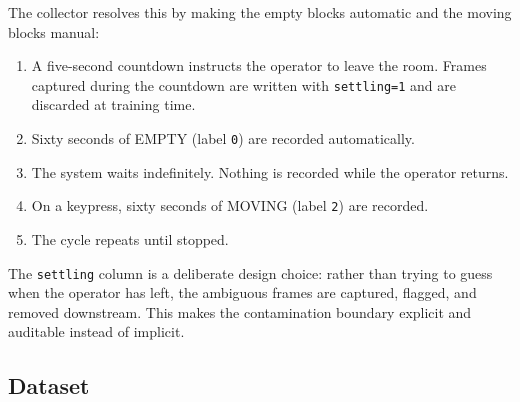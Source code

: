 \documentclass[11pt,a4paper]{article}
\newcommand{\code}[1]{\texttt{\small #1}}
\begin{document}
The collector resolves this by making the empty blocks automatic and the moving
blocks manual:

\begin{enumerate}[leftmargin=1.6em, itemsep=2pt]
  \item A five-second countdown instructs the operator to leave the room.
        Frames captured during the countdown are written with
        \code{settling=1} and are discarded at training time.
  \item Sixty seconds of EMPTY (label \code{0}) are recorded automatically.
  \item The system waits indefinitely. Nothing is recorded while the operator
        returns.
  \item On a keypress, sixty seconds of MOVING (label \code{2}) are recorded.
  \item The cycle repeats until stopped.
\end{enumerate}

\noindent
The \code{settling} column is a deliberate design choice: rather than trying to
guess when the operator has left, the ambiguous frames are captured, flagged,
and removed downstream. This makes the contamination boundary explicit and
auditable instead of implicit.

\subsection{Dataset}
\end{document}
